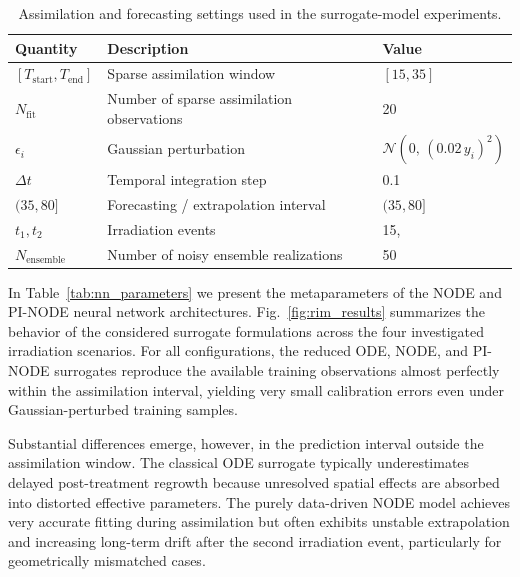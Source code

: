 \begin{table}[H]
\caption{Assimilation and forecasting settings used in the surrogate-model experiments.}
\label{tab:assimilation}
\centering
\small
\begin{tabular}{lll}
\toprule
Quantity & Description & Value \\
\midrule

$[T_{\mathrm{start}},T_{\mathrm{end}}]$
& Sparse assimilation window
& $[15,35]$ \\

$N_{\mathrm{fit}}$
& Number of sparse assimilation observations
& 20 \\

$\epsilon_i$
& Gaussian perturbation
& $\mathcal{N}\!\left(0,\,(0.02\,y_i)^2\right)$ \\

$\Delta t$
& Temporal integration step
& 0.1 \\

$(35,80]$
& Forecasting / extrapolation interval
& $(35,80]$ \\

$t_1,t_2$
& Irradiation events
& 15,\;45 \\

$N_{\mathrm{ensemble}}$
& Number of noisy ensemble realizations
& 50 \\

\bottomrule
\end{tabular}
\end{table}

In Table~\ref{tab:nn_parameters} we present the metaparameters of the NODE and PI-NODE neural
network architectures. Fig.~\ref{fig:rim_results}  summarizes the behavior of the considered
surrogate formulations across the four investigated irradiation scenarios.
For all configurations, the reduced ODE, NODE, and PI-NODE surrogates
reproduce the available training observations almost perfectly within the
assimilation interval, yielding very small calibration errors even under
Gaussian-perturbed training samples.

Substantial differences emerge, however, in the prediction interval outside the assimilation window. The classical ODE surrogate typically underestimates delayed post-treatment regrowth because unresolved spatial effects are absorbed into distorted effective parameters. The purely data-driven NODE model achieves very accurate fitting during assimilation but often exhibits unstable extrapolation and increasing long-term drift after the second irradiation event, particularly for geometrically mismatched cases.

